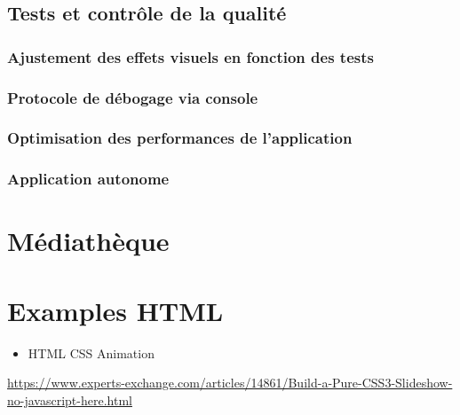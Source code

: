\documentclass[
  french,
]{book}
\providecommand{\tightlist}{%
  \setlength{\itemsep}{0pt}\setlength{\parskip}{0pt}}
\begin{document}
\hypertarget{tests-et-contruxf4le-de-la-qualituxe9}{%
\section{Tests et contrôle de la qualité}\label{tests-et-contruxf4le-de-la-qualituxe9}}

\hypertarget{ajustement-des-effets-visuels-en-fonction-des-tests}{%
\subsection{Ajustement des effets visuels en fonction des tests}\label{ajustement-des-effets-visuels-en-fonction-des-tests}}

\hypertarget{protocole-de-duxe9bogage-via-console}{%
\subsection{Protocole de débogage via console}\label{protocole-de-duxe9bogage-via-console}}

\hypertarget{optimisation-des-performances-de-lapplication}{%
\subsection{Optimisation des performances de l'application}\label{optimisation-des-performances-de-lapplication}}

\hypertarget{application-autonome}{%
\subsection{Application autonome}\label{application-autonome}}

\hypertarget{muxe9diathuxe8que}{%
\chapter{Médiathèque}\label{muxe9diathuxe8que}}

\hypertarget{examples-html}{%
\chapter{Examples HTML}\label{examples-html}}

\begin{itemize}
\tightlist
\item
  HTML CSS Animation
\end{itemize}

\url{https://www.experts-exchange.com/articles/14861/Build-a-Pure-CSS3-Slideshow-no-javascript-here.html}
\end{document}

